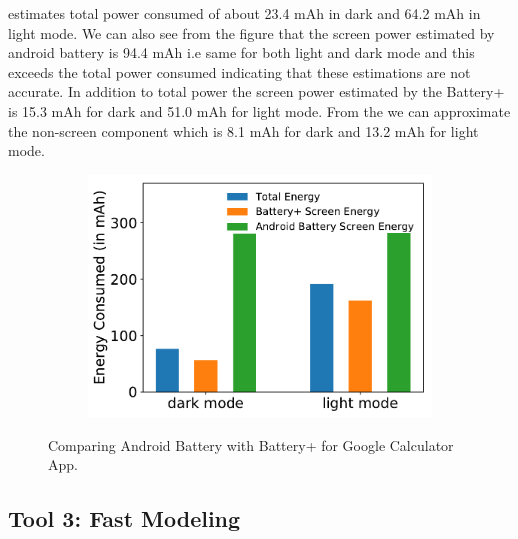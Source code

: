 estimates total power consumed of about 23.4 mAh in dark and 64.2
mAh in light mode.  We can also see from the figure that the screen
power estimated by android battery is 94.4 mAh i.e same for both
light and dark mode and this exceeds the total power consumed
indicating that these estimations are not accurate.  In addition to
total power the screen power estimated by the Battery+ is 15.3 mAh
for dark and 51.0 mAh for light mode.  From the we can approximate
the non-screen component which is 8.1 mAh for dark and 13.2 mAh for
light mode.  \fi
\fi

\begin{figure}[h]
	\begin{subfigure}[]{\columnwidth}
		\centering
		\includegraphics[width=0.8\columnwidth]{./figure/513_battery_compare.pdf}
	\end{subfigure}
        \vspace{-0.1in}
	\caption{Comparing Android Battery with Battery+ for Google Calculator App.
}
	\label{fig:tool2_battery_compare}
\end{figure}
\fi
% 
% 

\subsection{Tool 3: Fast Modeling}

